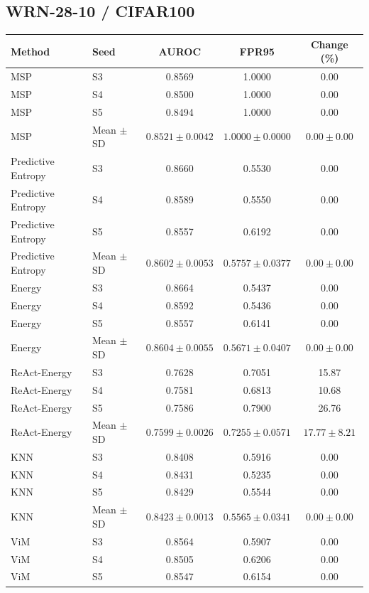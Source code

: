 \subsection*{WRN-28-10 / CIFAR100}
\begingroup
\footnotesize
\setlength{\tabcolsep}{3pt}
\renewcommand{\arraystretch}{1.1}
\begin{longtable}{@{}llccc@{}}
\toprule
Method & Seed & AUROC & FPR95 & Change (\%) \\
\midrule
\endhead
\bottomrule
\endlastfoot
MSP & S3 & 0.8569 & 1.0000 & 0.00 \\
MSP & S4 & 0.8500 & 1.0000 & 0.00 \\
MSP & S5 & 0.8494 & 1.0000 & 0.00 \\
MSP & Mean $\pm$ SD & $0.8521 \pm 0.0042$ & $1.0000 \pm 0.0000$ & $0.00 \pm 0.00$ \\
Predictive Entropy & S3 & 0.8660 & 0.5530 & 0.00 \\
Predictive Entropy & S4 & 0.8589 & 0.5550 & 0.00 \\
Predictive Entropy & S5 & 0.8557 & 0.6192 & 0.00 \\
Predictive Entropy & Mean $\pm$ SD & $0.8602 \pm 0.0053$ & $0.5757 \pm 0.0377$ & $0.00 \pm 0.00$ \\
Energy & S3 & 0.8664 & 0.5437 & 0.00 \\
Energy & S4 & 0.8592 & 0.5436 & 0.00 \\
Energy & S5 & 0.8557 & 0.6141 & 0.00 \\
Energy & Mean $\pm$ SD & $0.8604 \pm 0.0055$ & $0.5671 \pm 0.0407$ & $0.00 \pm 0.00$ \\
ReAct-Energy & S3 & 0.7628 & 0.7051 & 15.87 \\
ReAct-Energy & S4 & 0.7581 & 0.6813 & 10.68 \\
ReAct-Energy & S5 & 0.7586 & 0.7900 & 26.76 \\
ReAct-Energy & Mean $\pm$ SD & $0.7599 \pm 0.0026$ & $0.7255 \pm 0.0571$ & $17.77 \pm 8.21$ \\
KNN & S3 & 0.8408 & 0.5916 & 0.00 \\
KNN & S4 & 0.8431 & 0.5235 & 0.00 \\
KNN & S5 & 0.8429 & 0.5544 & 0.00 \\
KNN & Mean $\pm$ SD & $0.8423 \pm 0.0013$ & $0.5565 \pm 0.0341$ & $0.00 \pm 0.00$ \\
ViM & S3 & 0.8564 & 0.5907 & 0.00 \\
ViM & S4 & 0.8505 & 0.6206 & 0.00 \\
ViM & S5 & 0.8547 & 0.6154 & 0.00 \\

\end{longtable}
